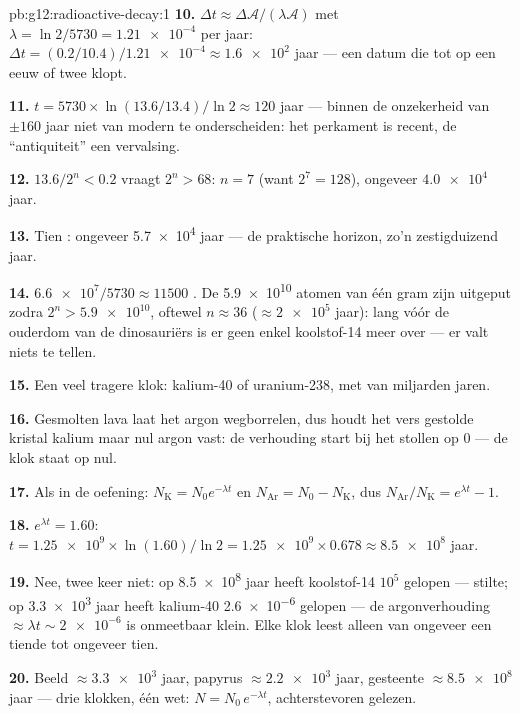 \begin{solution}{pb:g12:radioactive-decay:1}
\textbf{10.} $\Delta t \approx \Delta\mathcal A/(\lambda\mathcal A)$ met
$\lambda = \ln 2/5730 = \num{1.21e-4}$ per jaar:
$\Delta t = (0.2/10.4)/\num{1.21e-4} \approx \num{1.6e2}$ jaar --- een datum
die tot op een eeuw of twee klopt.

\textbf{11.} $t = \num{5730} \times \ln(13.6/13.4)/\ln 2 \approx 120$ jaar
--- binnen de onzekerheid van $\pm 160$ jaar niet van modern te onderscheiden:
het perkament is recent, de ``antiquiteit'' een vervalsing.

\textbf{12.} $13.6/2^n < 0.2$ vraagt $2^n > 68$: $n = 7$ 
(want $2^7 = 128$), ongeveer $\num{4.0e4}$ jaar.

\textbf{13.} Tien : ongeveer \num{5.7e4} jaar --- de
praktische horizon, zo'n zestigduizend jaar.

\textbf{14.} $\num{6.6e7}/\num{5730} \approx \num{11500}$ . De
\num{5.9e10} atomen van één gram zijn uitgeput zodra
$2^n > \num{5.9e10}$, oftewel $n \approx 36$ 
($\approx \num{2e5}$ jaar): lang vóór de ouderdom van de dinosauriërs is er
geen enkel  koolstof-14 meer over --- er valt niets te tellen.

\textbf{15.} Een veel tragere klok: kalium-40 of uranium-238, met
 van miljarden jaren.

\textbf{16.} Gesmolten lava laat het argon wegborrelen, dus houdt het vers
gestolde kristal kalium maar nul argon vast: de verhouding start bij het
stollen op $0$ --- de klok staat op nul.

\textbf{17.} Als in de oefening: $N_{\mathrm K} = N_0 e^{-\lambda t}$ en
$N_{\mathrm{Ar}} = N_0 - N_{\mathrm K}$, dus
$N_{\mathrm{Ar}}/N_{\mathrm K} = e^{\lambda t} - 1$.

\textbf{18.} $e^{\lambda t} = 1.60$:
$t = \num{1.25e9} \times \ln(1.60)/\ln 2 = \num{1.25e9} \times 0.678
\approx \num{8.5e8}$ jaar.

\textbf{19.} Nee, twee keer niet: op \num{8.5e8} jaar heeft koolstof-14
$10^5$  gelopen --- stilte; op \num{3.3e3} jaar heeft
kalium-40 \num{2.6e-6}  gelopen --- de argonverhouding
$\approx \lambda t \sim \num{2e-6}$ is onmeetbaar klein. Elke klok leest
alleen van ongeveer een tiende  tot ongeveer tien.

\textbf{20.} Beeld $\approx \num{3.3e3}$ jaar, papyrus $\approx \num{2.2e3}$
jaar, gesteente $\approx \num{8.5e8}$ jaar --- drie klokken, één wet:
$N = N_0\,e^{-\lambda t}$, achterstevoren gelezen.
\end{solution}

